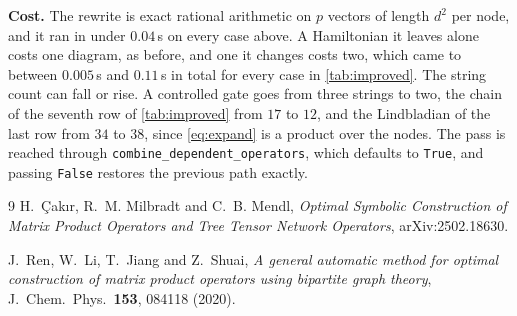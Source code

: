 \documentclass[11pt,a4paper]{article}
\newcommand{\code}[1]{\texttt{#1}}
\begin{document}
\textbf{Cost.} The rewrite is exact rational arithmetic on $p$ vectors of length $d^2$ per node, and
it ran in under $0.04$\,s on every case above. A Hamiltonian it leaves alone costs one diagram, as
before, and one it changes costs two, which came to between $0.005$\,s and $0.11$\,s in total for
every case in \cref{tab:improved}. The string count can fall or rise. A controlled gate
goes from three strings to two, the chain of the seventh row of \cref{tab:improved} from $17$ to
$12$, and the Lindbladian of the last row from $34$ to $38$, since \cref{eq:expand} is a product over
the nodes. The pass is reached through \code{combine\_dependent\_operators}, which defaults to
\code{True}, and passing \code{False} restores the previous path exactly.


{\small
\begin{thebibliography}{9}
\setlength{\itemsep}{1pt}
H.~\c{C}ak{\i}r, R.~M. Milbradt and C.~B. Mendl, \emph{Optimal Symbolic Construction of Matrix
Product Operators and Tree Tensor Network Operators}, arXiv:2502.18630.

J.~Ren, W.~Li, T.~Jiang and Z.~Shuai, \emph{A general automatic method for optimal construction of
matrix product operators using bipartite graph theory}, J.~Chem.\ Phys.\ \textbf{153}, 084118 (2020).
\end{thebibliography}
}
\end{document}
